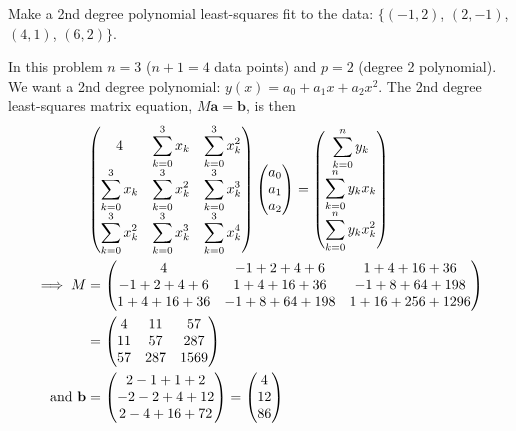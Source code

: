 \exemple{\upline}
{
	\noindent Make a 2nd degree polynomial least-squares fit to the data: $\{ (-1,2)$, $(2,-1)$, $(4,1)$, $(6,2) \}$. 
	
	\noindent In this problem $n=3$ ($n+1=4$ data points) and $p=2$ (degree 2 polynomial). We want a 2nd degree polynomial: $y(x) = a_0 + a_1 x + a_2 x^2$. The 2nd degree least-squares matrix equation, $M\mathbf{a} = \mathbf{b}$, is then
	\begin{align*}
	&
	\begin{pmatrix}
	4 & \displaystyle\sum_{k=0}^3 x_k & \displaystyle\sum_{k=0}^3  x_k^2 \\
	\displaystyle\sum_{k=0}^3 x_k & \displaystyle\sum_{k=0}^3 x_k^2 & \displaystyle\sum_{k=0}^3  x_k^3   \\
	\displaystyle\sum_{k=0}^3 x_k^2 & \displaystyle\sum_{k=0}^3 x_k^3 & \displaystyle\sum_{k=0}^3  x_k^4 
	\end{pmatrix}
	\begin{pmatrix}
	a_0 \\ a_1 \\ a_2
	\end{pmatrix}
	=
	\begin{pmatrix}
	\displaystyle\sum_{k=0}^n y_k \\ \displaystyle\sum_{k=0}^n y_k x_k \\ \displaystyle\sum_{k=0}^n y_k x_k^2 
	\end{pmatrix} \\
	\implies  M &=
	\begin{pmatrix}
	4 & -1+2+4+6 & 1+4+16+36 \\
	-1+2+4+6 & 1+4+16+36 & -1+8+64+198   \\
	1+4+16+36 & -1+8+64+198 & 1+16+256+1296
	\end{pmatrix} \\
	&=
	\begin{pmatrix}
	4 & 11 & 57 \\
	11 & 57 & 287   \\
	57 & 287 & 1569
	\end{pmatrix} \\
	\text{and }  \mathbf{b} &=
	\begin{pmatrix}
	2-1+1+2 \\ 
	-2-2+4+12 \\ 
	2-4+16+72
	\end{pmatrix}
	=
	\begin{pmatrix}
	4 \\ 
	12 \\ 
	86
	\end{pmatrix}
	\end{align*}
}
